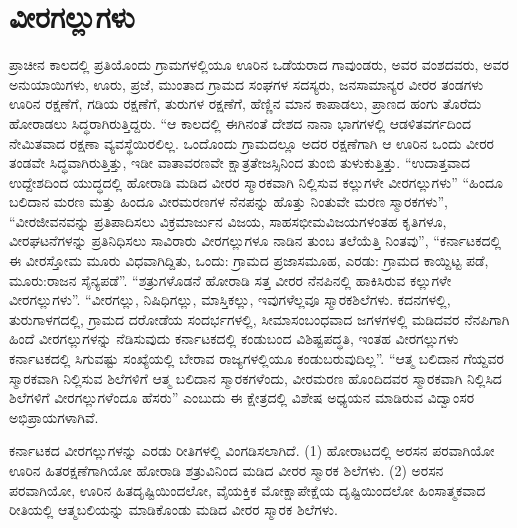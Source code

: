 \newpage

\section*{ವೀರಗಲ್ಲುಗಳು}

ಪ್ರಾಚೀನ ಕಾಲದಲ್ಲಿ ಪ್ರತಿಯೊಂದು ಗ್ರಾಮಗಳಲ್ಲಿಯೂ ಊರಿನ ಒಡೆಯರಾದ ಗಾವುಂಡರು, ಅವರ ವಂಶದವರು, ಅವರ ಅನುಯಾಯಿಗಳು, ಊರು, ಪ್ರಜೆ, ಮುಂತಾದ ಗ್ರಾಮದ ಸಂಘಗಳ ಸದಸ್ಯರು, ಜನಸಾಮಾನ್ಯರ ವೀರರ ತಂಡಗಳು ಊರಿನ ರಕ್ಷಣೆಗೆ, ಗಡಿಯ ರಕ್ಷಣೆಗೆ, ತುರುಗಳ ರಕ್ಷಣೆಗೆ, ಹೆಣ್ಣಿನ ಮಾನ ಕಾಪಾಡಲು, ಪ್ರಾಣದ ಹಂಗು ತೊರೆದು ಹೋರಾಡಲು ಸಿದ್ಧರಾಗಿರುತ್ತಿದ್ದರು. “ಆ ಕಾಲದಲ್ಲಿ ಈಗಿನಂತೆ ದೇಶದ ನಾನಾ ಭಾಗಗಳಲ್ಲಿ ಆಡಳಿತವರ್ಗದಿಂದ ನೇಮಿತವಾದ ರಕ್ಷಣಾ ವ್ಯವಸ್ಥೆಯಿರಲಿಲ್ಲ. ಒಂದೊಂದು ಗ್ರಾಮದಲ್ಲೂ ಅದರ ರಕ್ಷಣೆಗಾಗಿ ಆ ಊರಿನ ಒಂದು ವೀರರ ತಂಡವೇ ಸಿದ್ಧವಾಗಿರುತ್ತಿತ್ತು, ಇಡೀ ವಾತಾವರಣವೇ ಕ್ಷಾತ್ರತೇಜಸ್ಸಿನಿಂದ ತುಂಬಿ ತುಳುಕುತ್ತಿತ್ತು. “ಉದಾತ್ತವಾದ ಉದ್ದೇಶದಿಂದ ಯುದ್ಧದಲ್ಲಿ ಹೋರಾಡಿ ಮಡಿದ ವೀರರ ಸ್ಮಾರಕವಾಗಿ ನಿಲ್ಲಿಸುವ ಕಲ್ಲುಗಳೇ ವೀರಗಲ್ಲುಗಳು” “ಹಿಂದೂ ಬಲಿದಾನ ಮರಣ ಮತ್ತು ಹಿಂದೂ ವೀರಮರಣಗಳ ನೆನಪನ್ನು ಹೊತ್ತು ನಿಂತುವೇ ಮರಣ ಸ್ಮಾರಕಗಳು”, “ವೀರಜೀವನವನ್ನು ಪ್ರತಿಪಾದಿಸಲು ವಿಕ್ರಮಾರ್ಜುನ ವಿಜಯ, ಸಾಹಸಭೀಮವಿಜಯಗಳಂತಹ ಕೃತಿಗಳೂ, ವೀರಘಟನೆಗಳನ್ನು ಪ್ರತಿನಿಧಿಸಲು ಸಾವಿರಾರು ವೀರಗಲ್ಲುಗಳೂ ನಾಡಿನ ತುಂಬ ತಲೆಯೆತ್ತಿ ನಿಂತವು”, “ಕರ್ನಾಟಕದಲ್ಲಿ ಈ ವೀರಸ್ತೋಮ ಮೂರು ವಿಧವಾಗಿದ್ದಿತು, ಒಂದು: ಗ್ರಾಮದ ಪ್ರಜಾಸಮೂಹ, ಎರಡು: ಗ್ರಾಮದ ಕಾಯ್ದಿಟ್ಟ ಪಡೆ, ಮೂರು:ರಾಜನ ಸೈನ್ಯಪಡೆ”. “ಶತ್ರುಗಳೊಡನೆ ಹೋರಾಡಿ ಸತ್ತ ವೀರರ ನೆನಪಿನಲ್ಲಿ ಹಾಕಿಸಿರುವ ಕಲ್ಲುಗಳೇ ವೀರಗಲ್ಲುಗಳು”. “ವೀರಗಲ್ಲು, ನಿಷಿಧಿಗಲ್ಲು, ಮಾಸ್ತಿಕಲ್ಲು, ಇವುಗಳೆಲ್ಲವೂ ಸ್ಮಾರಕಶಿಲೆಗಳು. ಕದನಗಳಲ್ಲಿ, ತುರುಗಾಳಗದಲ್ಲಿ, ಗ್ರಾಮದ ದರೋಡೆಯ ಸಂದರ್ಭಗಳಲ್ಲಿ, ಸೀಮಾಸಂಬಂಧವಾದ ಜಗಳಗಳಲ್ಲಿ ಮಡಿದವರ ನೆನಪಿಗಾಗಿ ಹಿಂದೆ ವೀರಗಲ್ಲುಗಳನ್ನು ನೆಡಿಸುವುದು ಕರ್ನಾಟಕದಲ್ಲಿ ಕಂಡುಬಂದ ವಿಶಿಷ್ಟಪದ್ಧತಿ, ಇಂತಹ ವೀರಗಲ್ಲುಗಳು ಕರ್ನಾಟಕದಲ್ಲಿ ಸಿಗುವಷ್ಟು ಸಂಖ್ಯೆಯಲ್ಲಿ ಬೇರಾವ ರಾಜ್ಯಗಳಲ್ಲಿಯೂ ಕಂಡುಬರುವುದಿಲ್ಲ”. “ಆತ್ಮ ಬಲಿದಾನ ಗೆಯ್ದವರ ಸ್ಮಾರಕವಾಗಿ ನಿಲ್ಲಿಸುವ ಶಿಲೆಗಳಿಗೆ ಆತ್ಮ ಬಲಿದಾನ ಸ್ಮಾರಕಗಳೆಂದು, ವೀರಮರಣ ಹೊಂದಿದವರ ಸ್ಮಾರಕವಾಗಿ ನಿಲ್ಲಿಸಿದ ಶಿಲೆಗಳಿಗೆ ವೀರಗಲ್ಲುಗಳೆಂದೂ ಹೆಸರು” ಎಂಬುದು ಈ ಕ್ಷೇತ್ರದಲ್ಲಿ ವಿಶೇಷ ಅಧ್ಯಯನ ಮಾಡಿರುವ ವಿದ್ವಾಂಸರ ಅಭಿಪ್ರಾಯಗಳಾಗಿವೆ.

ಕರ್ನಾಟಕದ ವೀರಗಲ್ಲುಗಳನ್ನು ಎರಡು ರೀತಿಗಳಲ್ಲಿ ವಿಂಗಡಿಸಲಾಗಿದೆ. (1) ಹೋರಾಟದಲ್ಲಿ ಅರಸನ ಪರವಾಗಿಯೋ ಊರಿನ ಹಿತರಕ್ಷಣೆಗಾಗಿಯೋ ಹೋರಾಡಿ ಶತ್ರುವಿನಿಂದ ಮಡಿದ ವೀರರ ಸ್ಮಾರಕ ಶಿಲೆಗಳು. (2) ಅರಸನ ಪರವಾಗಿಯೋ, ಊರಿನ ಹಿತದೃಷ್ಟಿಯಿಂದಲೋ, ವೈಯಕ್ತಿಕ ಮೋಕ್ಷಾಪೇಕ್ಷೆಯ ದೃಷ್ಟಿಯಿಂದಲೋ ಹಿಂಸಾತ್ಮಕವಾದ ರೀತಿಯಲ್ಲಿ ಆತ್ಮಬಲಿಯನ್ನು ಮಾಡಿಕೊಂಡು ಮಡಿದ ವೀರರ ಸ್ಮಾರಕ ಶಿಲೆಗಳು.

